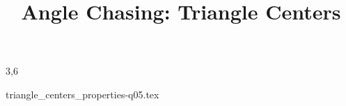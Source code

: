 \documentclass[a4paper,12pt]{article}
\begin{document}
\title{Angle Chasing: Triangle Centers}
\newcommand\event{S.3,4 Elite Mathematics Training}
\newcommand\learningobjective{
\item Review the triangle centers
\item Learn the angles involving triangle centers
}

\myfrontpage
\toggletrue{ownans}



\mynewpage
\begin{question}[]{3,6}
    
    
    
    
    
    {triangle_centers_properties-q05.tex}
    
    
\end{question}
\end{document}
